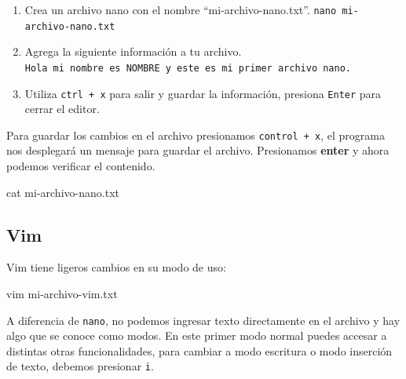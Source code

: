 \documentclass[
  spanish,
  12pt,
  letterpaper,
  DIV=11,
  numbers=noendperiod]{scrreprt}
\newenvironment{Shaded}{\begin{snugshade}}{\end{snugshade}}
\newcommand{\ExtensionTok}[1]{\textcolor[rgb]{0.00,0.23,0.31}{#1}}
\newcommand{\FunctionTok}[1]{\textcolor[rgb]{0.28,0.35,0.67}{#1}}
\newcommand{\NormalTok}[1]{\textcolor[rgb]{0.00,0.23,0.31}{#1}}
\providecommand{\tightlist}{%
  \setlength{\itemsep}{0pt}\setlength{\parskip}{0pt}}
\begin{document}
\begin{tcolorbox}[enhanced jigsaw, arc=.35mm, bottomrule=.15mm, bottomtitle=1mm, breakable, colback=white, colbacktitle=quarto-callout-note-color!10!white, colframe=quarto-callout-note-color-frame, coltitle=black, left=2mm, leftrule=.75mm, opacityback=0, opacitybacktitle=0.6, rightrule=.15mm, title={Ejercicio 6. Edición de archivos con nano}, titlerule=0mm, toprule=.15mm, toptitle=1mm]

\begin{enumerate}
\def\labelenumi{\arabic{enumi}.}
\tightlist
\item
  Crea un archivo nano con el nombre ``mi-archivo-nano.txt''.
  \texttt{nano\ mi-archivo-nano.txt}
\item
  Agrega la siguiente información a tu archivo.
  \texttt{Hola\ mi\ nombre\ es\ NOMBRE\ y\ este\ es\ mi\ primer\ archivo\ nano.}
\item
  Utiliza \texttt{ctrl\ +\ x} para salir y guardar la información,
  presiona \texttt{Enter} para cerrar el editor.
\end{enumerate}

\end{tcolorbox}

Para guardar los cambios en el archivo presionamos
\texttt{control\ +\ x}, el programa nos desplegará un mensaje para
guardar el archivo. Presionamos \textbf{enter} y ahora podemos verificar
el contenido.

\begin{Shaded}
\begin{Highlighting}[]
\FunctionTok{cat}\NormalTok{ mi{-}archivo{-}nano.txt}
\end{Highlighting}
\end{Shaded}

\subsection{Vim}\label{vim}

Vim tiene ligeros cambios en su modo de uso:

\begin{Shaded}
\begin{Highlighting}[]
\ExtensionTok{vim}\NormalTok{ mi{-}archivo{-}vim.txt }
\end{Highlighting}
\end{Shaded}

A diferencia de \texttt{nano}, no podemos ingresar texto directamente en
el archivo y hay algo que se conoce como modos. En este primer modo
normal puedes accesar a distintas otras funcionalidades, para cambiar a
modo escritura o modo inserción de texto, debemos presionar \texttt{i}.
\end{document}
